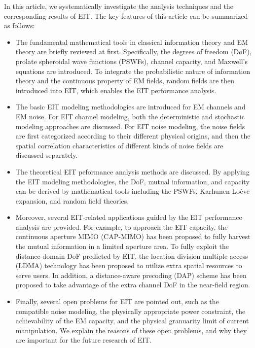 \documentclass[journal,twocolumn]{IEEEtran}
\begin{document}
In this article, we systematically investigate the analysis techniques and the corresponding results of EIT. The key features of this article can be summarized as follows:
\begin{itemize}
\item{The fundamental mathematical tools in classical information theory and EM theory are briefly reviewed at first. Specifically, the degrees of freedom (DoF), prolate spheroidal wave functions (PSWFs), channel capacity, and Maxwell's equations are introduced. To integrate the probabilistic nature of information theory and the continuous property of EM fields, random fields are then introduced into EIT, which enables the EIT performance analysis. }
\item{The basic EIT modeling methodologies are introduced for EM channels and EM noise. For EIT channel modeling, both the deterministic and stochastic modeling approaches are discussed. For EIT noise modeling, the noise fields are first categorized according to their different physical origins, and then the spatial correlation characteristics of different kinds of noise fields are discussed separately. }
\item{The theoretical EIT peformance analysis methods are discussed. By applying the EIT modeling methodologies, the DoF, mutual information, and capacity can be derived by mathematical tools including the PSWFs, Karhunen-Lo\`{e}ve expansion, and random field theories. } 
\item Moreover, several EIT-related applications guided by the EIT performance analysis are provided. For example, to approach the EIT capacity, the continuous aperture MIMO (CAP-MIMO) has been proposed to fully harvest the mutual information in a limited aperture area. To fully exploit the distance-domain DoF predicted by EIT, the location division multiple access (LDMA) technology has been proposed to utilize extra spatial resources to serve users. In addition, a distance-aware precoding (DAP) scheme has been proposed to take advantage of the extra channel DoF in the near-field region.  %
\item{Finally, several open problems for EIT are pointed out, such as the compatible noise modeling, the physically appropriate power constraint, the achievability of the EM capacity, and the physical granuarity limit of current manipulation. We explain the reasons of these open problems, and why they are important for the future research of EIT. }
\end{itemize}
\end{document}
